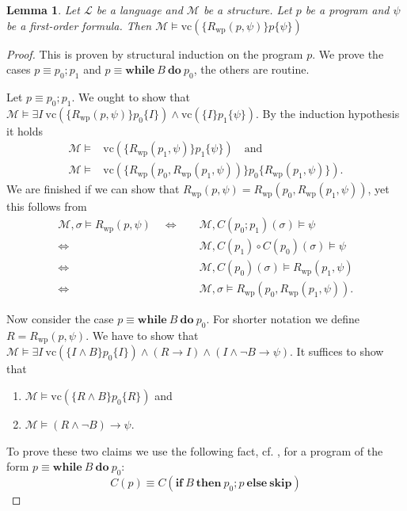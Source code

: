 \documentclass[acmsmall]{acmart}
\theoremstyle{plain}
\newtheorem{lemma}[theorem]{Lemma}
\theoremstyle{definition}
\newcommand{\calL}{\mathcal{L}}
\newcommand{\calM}{\mathcal{M}}
\newcommand{\impl}{\rightarrow} %
\newcommand{\hoare}[3]{\{#1\}#2\{#3\}}
\newcommand{\vc}{\mathrm{vc}}
\newcommand{\hskipit}{\textbf{skip}}
\newcommand{\hif}{\textbf{if}~}
\newcommand{\hthen}{~\textbf{then}~}
\newcommand{\helse}{~\textbf{else}~}
\newcommand{\hwhile}{\textbf{while}~}
\newcommand{\hdo}{~\textbf{do}~}
\renewcommand{\wp}{\mathrm{wp}}
\newcommand{\Rwp}{R_{\wp}}
\begin{document}
\begin{lemma}\label{lem.wpHoareTripel}
	Let $\calL$ be a language and $\calM$ be a structure. Let $p$ be a program and $\psi$ be a first-order formula. Then $\calM \models \vc(\hoare{R_{\wp}(p,\psi)}{p}{\psi})$
\end{lemma}
\begin{proof}
	This is proven by structural induction on the program $p$. We prove the cases $p \equiv p_0;p_1$ and $p \equiv \hwhile B \hdo p_0$, the others are routine.
	
	
	 Let $p \equiv p_0;p_1$. We ought to show that $\calM \models \exists I ~ \vc(\hoare{\Rwp(p,\psi)}{p_0}{I}) \wedge \vc(\hoare{I}{p_1}{\psi})$. By the induction hypothesis it holds
	 \begin{align*}
	 	\calM \models& \vc(\hoare{\Rwp(p_1,\psi)}{p_1}{\psi}) \quad \text{and}\\
	 	\calM \models& \vc(\hoare{\Rwp(p_0,\Rwp(p_1,\psi))}{p_0}{\Rwp(p_1,\psi)}).
	 \end{align*}
 	We are finished if we can show that $\Rwp(p,\psi) = \Rwp(p_0,\Rwp(p_1,\psi))$, yet this follows from
 	\begin{align*}
 		\calM, \sigma \models \Rwp(p,\psi) \quad 
 		\Leftrightarrow \quad&  \calM, C(p_0;p_1)(\sigma) \models \psi \\
 		\Leftrightarrow \quad& \calM, C(p_1) \circ C(p_0)(\sigma) \models \psi \\
 		\Leftrightarrow \quad& \calM, C(p_0)(\sigma) \models \Rwp(p_1,\psi) \\
 		\Leftrightarrow \quad& \calM, \sigma \models \Rwp(p_0,\Rwp(p_1,\psi)).
 	\end{align*}
 
 
 
	Now consider the case $p \equiv \hwhile B \hdo p_0$. For shorter notation we define $R = \Rwp(p,\psi)$. We have to show that $\calM \models \exists I ~\vc(\hoare{I\wedge B}{p_0}{I}) \wedge (R \impl I) \wedge (I\wedge \neg B \impl \psi)$. It suffices to show that
	\begin{enumerate}
		\item $\calM \models \vc(\hoare{R \wedge B}{p_0}{R})$ and
		\item $\calM \models (R \wedge \neg B) \impl  \psi$.
	\end{enumerate}


To prove these two claims we use the following fact, cf. \cite[Proposition 5.1.]{Winskel93Formal}, for a program of the form $p \equiv \hwhile B \hdo p_0$:
\begin{equation}\label{propWinskelWhile}
	C(p) \equiv C(\hif B \hthen p_0 ; p \helse \hskipit)
\end{equation}


\end{proof}
\end{document}
